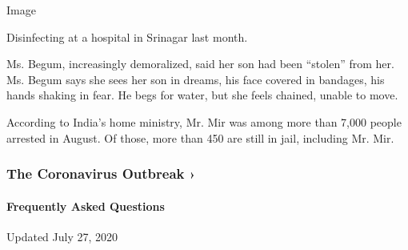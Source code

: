 Image

Disinfecting at a hospital in Srinagar last month.

Ms. Begum, increasingly demoralized, said her son had been ``stolen''
from her. Ms. Begum says she sees her son in dreams, his face covered in
bandages, his hands shaking in fear. He begs for water, but she feels
chained, unable to move.

According to India's home ministry, Mr. Mir was among more than 7,000
people arrested in August. Of those, more than 450 are still in jail,
including Mr. Mir.

\href{https://www.nytimes.com/news-event/coronavirus?action=click\&pgtype=Article\&state=default\&region=MAIN_CONTENT_3\&context=storylines_faq}{}

\hypertarget{the-coronavirus-outbreak-}{%
\subsubsection{The Coronavirus Outbreak
›}\label{the-coronavirus-outbreak-}}

\hypertarget{frequently-asked-questions}{%
\paragraph{Frequently Asked
Questions}\label{frequently-asked-questions}}

Updated July 27, 2020

